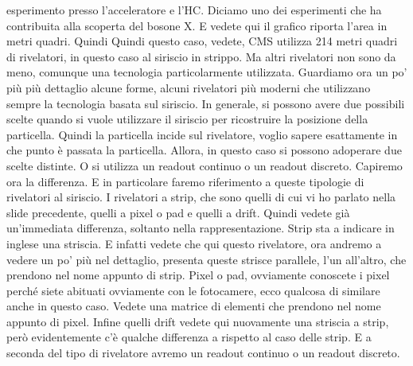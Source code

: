 {esperimento presso l'acceleratore e l'HC. Diciamo uno dei esperimenti che ha contribuita alla scoperta del bosone X. E vedete qui il grafico riporta l'area in metri quadri. Quindi Quindi questo caso, vedete, CMS utilizza 214 metri quadri di rivelatori, in questo caso al siriscio in strippo. Ma altri rivelatori non sono da meno, comunque una tecnologia particolarmente utilizzata. Guardiamo ora un po' più più dettaglio alcune forme, alcuni rivelatori più moderni che utilizzano sempre la tecnologia basata sul siriscio. In generale, si possono avere due possibili scelte quando si vuole utilizzare il siriscio per ricostruire la posizione della particella. Quindi la particella incide sul rivelatore, voglio sapere esattamente in che punto è passata la particella. Allora, in questo caso si possono adoperare due scelte distinte. O si utilizza un readout continuo o un readout discreto. Capiremo ora la differenza. E in particolare faremo riferimento a queste tipologie di rivelatori al siriscio. I rivelatori a strip, che sono quelli di cui vi ho parlato nella slide precedente, quelli a pixel o pad e quelli a drift. Quindi vedete già un'immediata differenza, soltanto nella rappresentazione. Strip sta a indicare in inglese una striscia. E infatti vedete che qui questo rivelatore, ora andremo a vedere un po' più nel dettaglio, presenta queste strisce parallele, l'un all'altro, che prendono nel nome appunto di strip. Pixel o pad, ovviamente conoscete i pixel perché siete abituati ovviamente con le fotocamere, ecco qualcosa di similare anche in questo caso. Vedete una matrice di elementi che prendono nel nome appunto di pixel. Infine quelli drift vedete qui nuovamente una striscia a strip, però evidentemente c'è qualche differenza a rispetto al caso delle strip. E a seconda del tipo di rivelatore avremo un readout continuo o un readout discreto. 

}
